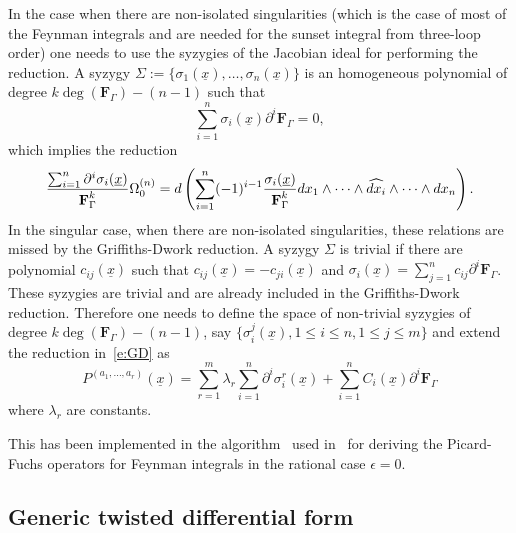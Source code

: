 \documentclass[a4paper,12pt]{article}
\numberwithin{equation}{section}
\numberwithin{figure}{subsection}
\theoremstyle{plain}
\theoremstyle{plain}
\theoremstyle{definition}
\theoremstyle{plain}
\theoremstyle{remark}
\theoremstyle{plain}
\begin{document}
In the case when there are non-isolated singularities (which is the
case of most of the Feynman integrals and are needed for the sunset
integral from three-loop order) one needs to use
the syzygies of the Jacobian ideal for performing the
reduction.
A syzygy  $\Sigma:=\{\sigma_1(\underline x),\dots,\sigma_n(\underline x)\}$ is an homogeneous polynomial of
degree $k \deg(\textbf{F}_\Gamma)-(n-1)$ such that
\begin{equation}
  \sum_{i=1}^n \sigma_i(\underline x) \partial^i   \textbf{F}_\Gamma=0,
\end{equation}
%
which implies the reduction
\begin{equation}
  {   \sum_{i=1}^n \partial^i\sigma_i (\underline x)\over \textbf{F}_\Gamma^k
  }\Omega_0^{(n)}=d\left(\sum_{i=1}^n (-1)^{i-1} {\sigma_i(\underline x)\over
      \textbf{F}_\Gamma^k} dx_1\wedge \cdots \wedge
    \widehat{dx_i}\wedge \cdots \wedge dx_n\right).
\end{equation}
In the singular case, when there are non-isolated singularities, these
relations are missed by the Griffiths-Dwork reduction.
A syzygy $\Sigma$ is trivial if there are polynomial
$c_{ij}(\underline x)$ such that $c_{ij}(\underline
x)=-c_{ji}(\underline x)$ and  $\sigma_i(\underline x)= \sum_{j=1}^n
c_{ij} \partial^i \textbf{F}_\Gamma$.  These syzygies are trivial and
are already included in the Griffiths-Dwork reduction.
Therefore one needs to define the space of non-trivial syzygies of
degree $k \deg(\textbf{F}_\Gamma)-(n-1)$, say $\{\sigma_i^j(\underline
x),  1\leq i\leq n,  1\leq j\leq m\}$ and extend the reduction
in~\eqref{e:GD} as 
\begin{equation}\label{e:GDsyz}
  P^{(a_1,\dots,a_r)}(\underline x)=   \sum_{r=1}^m \lambda_r\sum_{i=1}^n \partial^i \sigma^r_i(\underline x)+ \sum_{i=1}^n C_i(\underline
  x)\partial^i \textbf{F}_\Gamma
\end{equation}
where $\lambda_r$ are constants.

This has been implemented in the algorithm~\cite{lairez2016computing}
used in~\cite{Lairez:2022zkj} for deriving the Picard-Fuchs operators for
Feynman integrals in the rational case $\epsilon=0$.

\subsection{Generic twisted differential form}
\label{sec:non-rati-diff-form}
\end{document}
